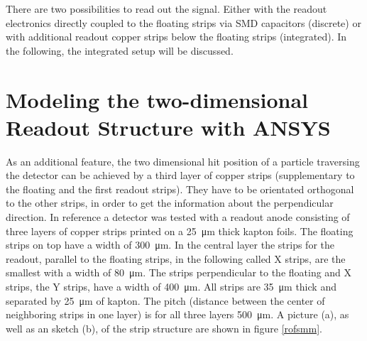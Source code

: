 \documentclass[
a4paper,                                %
twoside,                                %
BCOR1.4cm,                      %
10pt,                           %
headings=normal,                %
headsepline,                    %
clearplainpage, %
final,                                  %
div=14,
parskip=full,
openright,
bibliography=toc
]{scrreprt}
\begin{document}
There are two possibilities to read out the signal. Either with the readout electronics directly coupled to the floating strips via SMD capacitors (discrete) or with additional readout copper strips below the floating strips (integrated).\cite{jonaBthesis} In the following, the integrated setup will be discussed.

\section{Modeling the two-dimensional Readout Structure with ANSYS}

As an additional feature, the two dimensional hit position of a particle traversing the detector can be achieved by a third layer of copper strips (supplementary to the floating and the first readout strips). They have to be orientated orthogonal to the other strips, in order to get the information about the perpendicular direction. In reference \cite{felixKthesis} a detector was tested with a readout anode consisting of three layers of copper strips printed on a \SI{25}{\micro\m} thick kapton foils. The floating strips on top have a width of \SI{300}{\micro\m}. In the central layer the strips for the readout, parallel to the floating strips, in the following called X strips, are the smallest with a width of \SI{80}{\micro\m}. The strips perpendicular to the floating and X strips, the Y strips, have a width of \SI{400}{\micro\m}. All strips are \SI{35}{\micro\m} thick and separated by \SI{25}{\micro\m} of kapton. The pitch (distance between the center of neighboring strips in one layer) is for all three layers \SI{500}{\micro\m}. A picture (a), as well as an sketch (b), of the strip structure are shown in figure \ref{rofsmm}.
\end{document}
